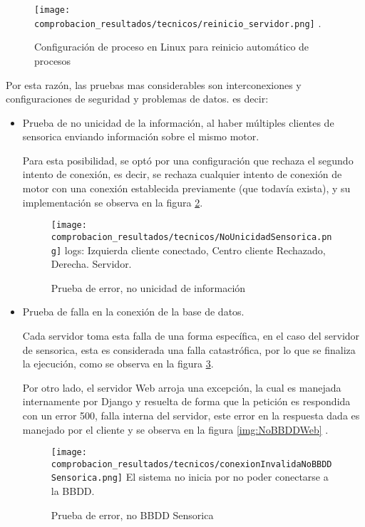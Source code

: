 	\begin{figure}[H]
		\centering
        \caption{Configuración de proceso en Linux para reinicio automático de procesos}
        \texttt{[image: comprobacion\_resultados/tecnicos/reinicio\_servidor.png]}
        \textcite{ConfiguracionProcesos}.
        \label{img:ProcesosLinux}
	\end{figure}

Por esta razón, las pruebas mas considerables son interconexiones y configuraciones
de seguridad y problemas de datos. es decir:

\begin{itemize}
    \item Prueba de no unicidad de la información, al haber múltiples
        clientes de sensorica enviando información sobre el mismo motor.

        Para esta posibilidad, se optó por una configuración que rechaza el
        segundo intento de conexión, es decir, se rechaza cualquier intento de
        conexión de motor con una conexión establecida previamente (que todavía
        exista), y su implementación se observa en la figura \ref{img:NoUnicidad}.
%
	\begin{figure}[H]
		\centering
        \caption{Prueba de error, no unicidad de información}
        \texttt{[image: comprobacion\_resultados/tecnicos/NoUnicidadSensorica.png]}
        logs: Izquierda cliente conectado, Centro cliente Rechazado, Derecha.
        Servidor.
        \label{img:NoUnicidad}
	\end{figure}
%
    \item Prueba de falla en la conexión de la base de datos.

        Cada servidor toma esta falla de una forma específica, en el caso del
        servidor de sensorica, esta es considerada una falla catastrófica, por
        lo que se finaliza la ejecución, como se observa en la figura
        \ref{img:NoBBDDSensorica}.

        Por otro lado, el servidor Web arroja una excepción, la cual es manejada
        internamente por Django y resuelta de forma que la petición es respondida
        con un error 500, falla interna del servidor, este error en la respuesta
        dada es manejado por el cliente y se observa en la figura
        \ref{img:NoBBDDWeb} .
%
    \begin{figure}[H]
		\centering
        \caption{Prueba de error, no BBDD Sensorica}
        \texttt{[image: comprobacion\_resultados/tecnicos/conexionInvalidaNoBBDDSensorica.png]}
        El sistema no inicia por no poder conectarse a la BBDD.
        \label{img:NoBBDDSensorica}
	\end{figure}


\end{itemize}
